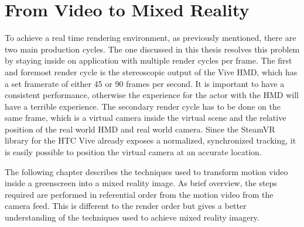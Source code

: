 %
\chapter{From Video to Mixed Reality}
\label{chap:video2mr}


To achieve a real time rendering environment, as previously mentioned, there 
are two main production cycles. The one discussed in this thesis resolves this 
problem by staying inside on application with multiple render cycles per frame. 
\newline
The first and foremost render cycle is the stereoscopic output of the Vive HMD, 
which has a set framerate of either 45 or 90 frames per second. It is important 
to have a consistent performance, otherwise the experience for the actor with 
the HMD will have a terrible experience.
\newline
The secondary render cycle has to be done on the same frame, which is a virtual 
camera inside the virtual scene and the relative position of the real world HMD 
and real world camera. Since the SteamVR library for the HTC Vive already 
exposes a normalized, synchronized tracking, it is easily possible to position 
the virtual camera at an accurate location.

The following chapter describes the techniques used to transform motion video 
inside a greenscreen into a mixed reality image. As brief overview, the steps 
required are performed in referential order from the motion video from the 
camera feed. This is different to the render order but gives a better 
understanding of the techniques used to achieve mixed reality imagery.

